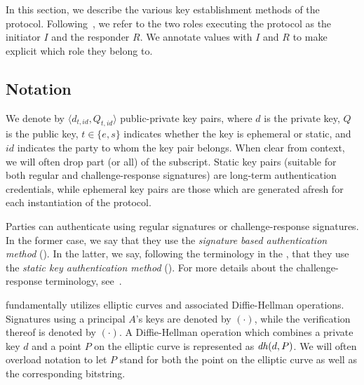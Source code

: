 In this section, we describe the various key establishment methods of the \mEdhoc{} protocol.
%
Following~\cite{Norr21}, we refer to the two roles executing the protocol as the initiator $I$ and the responder $R$.
%
We annotate values with $I$ and $R$ to make explicit which role they belong to.
%

\subsection{Notation}
\label{sec:notation}
We denote by $\langle d_{t, \mathit{id}}, Q_{t, \mathit{id}}\rangle$ public-private key pairs, where $d$ is the private key, $Q$ is the public key, $t \in \{e, s\}$ indicates whether the key is ephemeral or static, and $\mathit{id}$ indicates the party to whom the key pair belongs.
%
When clear from context, we will often drop part (or all) of the subscript.
%
Static key pairs (suitable for both regular and challenge-response signatures) are long-term authentication credentials, while ephemeral key pairs are those which are generated afresh for each instantiation of the protocol.
%

Parties can authenticate using regular signatures or challenge-response signatures. 
%
In the former case, we say that they use the \emph{signature based authentication method} (\mSig{}).
%
In the latter, we say, following the terminology in the \mSpec{}, that they use the \emph{static key authentication method} (\mStat{}).
%
For more details about the challenge-response terminology, see~\cite{DBLP:conf/crypto/Krawczyk05}.
%

\mEdhoc{} fundamentally utilizes elliptic curves and associated Diffie-Hellman operations. 
%
Signatures using a principal $A$'s keys are denoted by $(\cdot)$, while the verification thereof is denoted by $(\cdot)$.
%
A Diffie-Hellman operation which combines a private key $d$ and a point $P$ on the elliptic curve is represented as $\mathit{dh}(d, P)$.
%
We will often overload notation to let $P$ stand for both the point on the elliptic curve as well as the corresponding bitstring.

%
%

